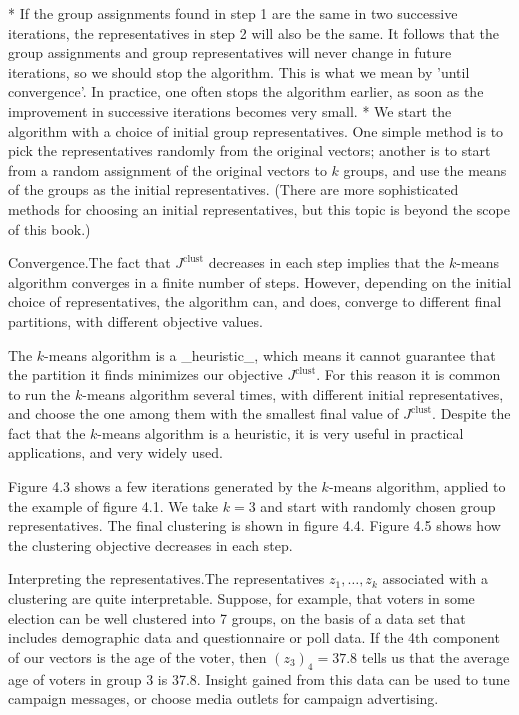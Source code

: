 * If the group assignments found in step 1 are the same in two successive iterations, the representatives in step 2 will also be the same. It follows that the group assignments and group representatives will never change in future iterations, so we should stop the algorithm. This is what we mean by 'until convergence'. In practice, one often stops the algorithm earlier, as soon as the improvement in successive iterations becomes very small.
* We start the algorithm with a choice of initial group representatives. One simple method is to pick the representatives randomly from the original vectors; another is to start from a random assignment of the original vectors to \(k\) groups, and use the means of the groups as the initial representatives. (There are more sophisticated methods for choosing an initial representatives, but this topic is beyond the scope of this book.)

Convergence.The fact that \(J^{\mathrm{clust}}\) decreases in each step implies that the \(k\)-means algorithm converges in a finite number of steps. However, depending on the initial choice of representatives, the algorithm can, and does, converge to different final partitions, with different objective values.

The \(k\)-means algorithm is a _heuristic_, which means it cannot guarantee that the partition it finds minimizes our objective \(J^{\mathrm{clust}}\). For this reason it is common to run the \(k\)-means algorithm several times, with different initial representatives, and choose the one among them with the smallest final value of \(J^{\mathrm{clust}}\). Despite the fact that the \(k\)-means algorithm is a heuristic, it is very useful in practical applications, and very widely used.

Figure 4.3 shows a few iterations generated by the \(k\)-means algorithm, applied to the example of figure 4.1. We take \(k=3\) and start with randomly chosen group representatives. The final clustering is shown in figure 4.4. Figure 4.5 shows how the clustering objective decreases in each step.

Interpreting the representatives.The representatives \(z_{1},\ldots,z_{k}\) associated with a clustering are quite interpretable. Suppose, for example, that voters in some election can be well clustered into 7 groups, on the basis of a data set that includes demographic data and questionnaire or poll data. If the 4th component of our vectors is the age of the voter, then \((z_{3})_{4}=37.8\) tells us that the average age of voters in group 3 is 37.8. Insight gained from this data can be used to tune campaign messages, or choose media outlets for campaign advertising.

